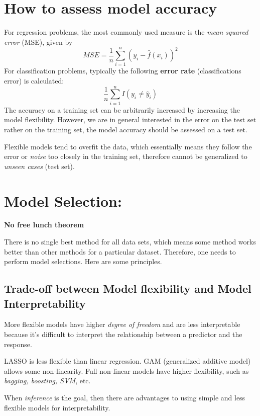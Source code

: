 \documentclass[
  letterpaper,
  DIV=11,
  numbers=noendperiod]{scrreprt}
\begin{document}
\section{How to assess model
accuracy}\label{how-to-assess-model-accuracy}

For regression problems, the most commonly used measure is the
\emph{mean squared error} (MSE), given by \[
MSE = \frac{1}{n}\sum_{i=1}^n (y_i-\hat{f}(x_i))^2
\] For classification problems, typically the following \textbf{error
rate} (classifications error) is calculated: \[
\frac{1}{n} \sum_{i=1}^{n} I(y_i\ne \hat{y}_i)
\] The accuracy on a training set can be arbitrarily increased by
increasing the model flexibility. However, we are in general interested
in the error on the test set rather on the training set, the model
accuracy should be assessed on a test set.

Flexible models tend to overfit the data, which essentially means they
follow the error or \emph{noise} too closely in the training set,
therefore cannot be generalized to \emph{unseen cases} (test set).

\section{Model Selection:}\label{model-selection}

\textbf{No free lunch theorem}

There is no single best method for all data sets, which means some
method works better than other methods for a particular dataset.
Therefore, one needs to perform model selections. Here are some
principles.

\subsection{Trade-off between Model flexibility and Model
Interpretability}\label{trade-off-between-model-flexibility-and-model-interpretability}

More flexible models have higher \emph{degree of freedom} and are less
interpretable because it's difficult to interpret the relationship
between a predictor and the response.

LASSO is less flexible than linear regression. GAM (generalized additive
model) allows some non-linearity. Full non-linear models have higher
flexibility, such as \emph{bagging, boosting, SVM}, etc.

When \emph{inference} is the goal, then there are advantages to using
simple and less flexible models for interpretability.
\end{document}
